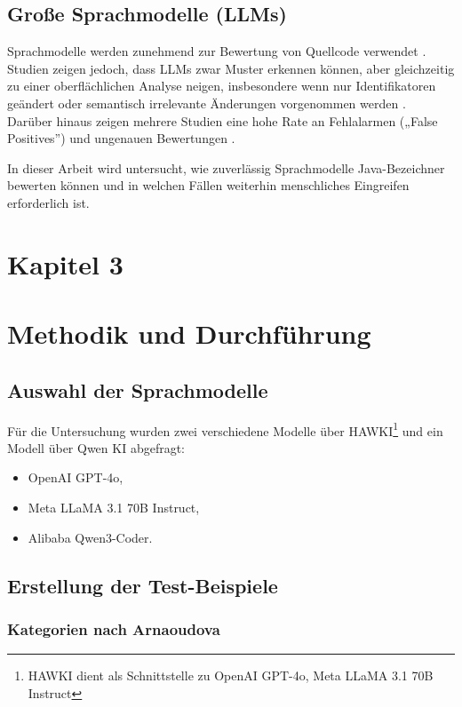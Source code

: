 \documentclass[a4paper,12pt]{article}
\begin{document}
\subsection{Große Sprachmodelle (LLMs)}

Sprachmodelle werden zunehmend zur Bewertung von Quellcode verwendet
\cite{automaticprogramming2025}. Studien zeigen jedoch, dass LLMs zwar Muster
erkennen können, aber gleichzeitig zu einer oberflächlichen Analyse neigen, insbesondere wenn nur Identifikatoren geändert oder semantisch irrelevante Änderungen vorgenommen werden \cite{llmmaintainablereliable2025}. Darüber hinaus zeigen mehrere Studien eine hohe Rate an Fehlalarmen („False Positives”) und ungenauen Bewertungen \cite{llmsmells2025, llmdetection2025}.

In dieser Arbeit wird untersucht, wie zuverlässig Sprachmodelle Java-Bezeichner bewerten können und in welchen Fällen weiterhin menschliches Eingreifen erforderlich ist.

\newpage
\section*{Kapitel 3}
\section{Methodik und Durchführung}

\subsection{Auswahl der Sprachmodelle}

Für die Untersuchung wurden zwei verschiedene Modelle über HAWKI\footnote{HAWKI
    dient als Schnittstelle zu OpenAI GPT-4o, Meta LLaMA 3.1 70B Instruct} und ein Modell über Qwen KI abgefragt:

\begin{itemize}
    \item OpenAI GPT-4o,
    \item Meta LLaMA 3.1 70B Instruct,
    \item Alibaba Qwen3-Coder.
\end{itemize}

\subsection{Erstellung der Test-Beispiele}

\subsubsection{Kategorien nach Arnaoudova}
\end{document}
